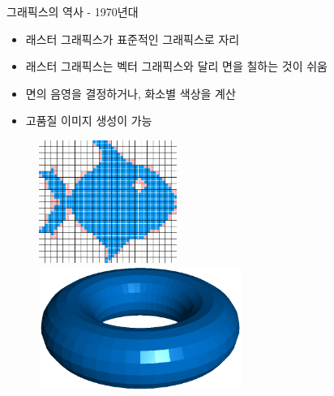 \documentclass{beamer}
\begin{document}
\begin{frame}{그래픽스의 역사 - 1970년대}

\begin{itemize}
\item 래스터 그래픽스가 표준적인 그래픽스로 자리
\item 래스터 그래픽스는 벡터 그래픽스와 달리 면을 칠하는 것이 쉬움
\item 면의 음영을 결정하거나, 화소별 색상을 계산
\item 고품질 이미지 생성이 가능
\end{itemize}

\begin{figure}
    \includegraphics[height=4cm]{OGL_intro/rasterFish.jpg}
    \includegraphics[height=4cm]{OGL_intro/flatShading.png}
\end{figure}

\end{frame}
\end{document}
